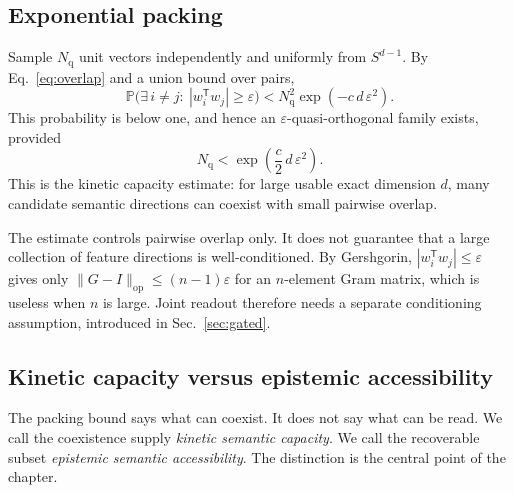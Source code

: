\documentclass[
  aps,
  reprint,
  superscriptaddress,
  floatfix,
  nofootinbib,
  longbibliography
]{revtex4-2}
\newcommand{\Prob}{\mathbb{P}}
\newcommand{\Sph}[1]{S^{#1}}
\newcommand{\Nq}{N_{\mathrm q}}
\newcommand{\T}{^{\mathsf{T}}}
\newcommand{\opnorm}[1]{\lVert #1 \rVert_{\mathrm{op}}}
\begin{document}
\subsection{Exponential packing}
\label{sec:packing}

Sample $\Nq$ unit vectors independently and uniformly from
$\Sph{d-1}$. By Eq.~\eqref{eq:overlap} and a union bound over pairs,
%
\begin{equation}
\label{eq:unionbound}
\Prob\bigl(\exists\,i\neq j:\ |w_i\T w_j|\ge\varepsilon\bigr)
 < \Nq^{2}\exp(-c\,d\,\varepsilon^{2}).
\end{equation}
%
This probability is below one, and hence an
$\varepsilon$-quasi-orthogonal family exists, provided
%
\begin{equation}
\label{eq:packing}
\Nq < \exp\!\left(\frac{c}{2}\,d\,\varepsilon^{2}\right).
\end{equation}
%
This is the kinetic capacity estimate: for large usable exact dimension $d$,
many candidate semantic directions can coexist with small pairwise
overlap.

The estimate controls pairwise overlap only. It does not guarantee that
a large collection of feature directions is well-conditioned. By Gershgorin,
$|w_i\T w_j|\le\varepsilon$ gives only
$\opnorm{G-I}\le(n-1)\varepsilon$ for an $n$-element Gram matrix, which
is useless when $n$ is large. Joint readout therefore needs a
separate conditioning assumption, introduced in Sec.~\ref{sec:gated}.

\subsection{Kinetic capacity versus epistemic accessibility}
\label{sec:kinetic-epistemic}

The packing bound says what can coexist. It does not say what can be
read. We call the coexistence supply \emph{kinetic semantic capacity}.
We call the recoverable subset \emph{epistemic semantic accessibility}.
The distinction is the central point of the chapter.
\end{document}

